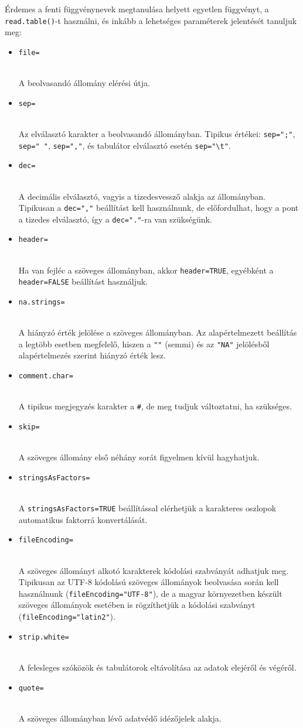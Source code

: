 \documentclass[
]{book}
\providecommand{\tightlist}{%
  \setlength{\itemsep}{0pt}\setlength{\parskip}{0pt}}
\begin{document}
Érdemes a fenti függvénynevek megtanulása helyett egyetlen függvényt, a \texttt{read.table()}-t használni, és inkább a lehetséges paraméterek jelentését tanuljuk meg:

\begin{itemize}
\tightlist
\item
  \texttt{file=}\strut \\
  A beolvasandó állomány elérési útja.
\item
  \texttt{sep=}\strut \\
  Az elválasztó karakter a beolvasandó állományban. Tipikus értékei: \texttt{sep=";"}, \texttt{sep="\ "}, \texttt{sep=","}, és tabulátor elválasztó esetén \texttt{sep="\textbackslash{}t"}.
\item
  \texttt{dec=}\strut \\
  A decimális elválasztó, vagyis a tizedesvessző alakja az állományban. Tipikusan a \texttt{dec=","} beállítást kell használnunk, de előfordulhat, hogy a pont a tizedes elválasztó, így a \texttt{dec="."}-ra van szükségünk.
\item
  \texttt{header=}\strut \\
  Ha van fejléc a szöveges állományban, akkor \texttt{header=TRUE}, egyébként a \texttt{header=FALSE} beállítást használjuk.
\item
  \texttt{na.strings=}\strut \\
  A hiányzó érték jelölése a szöveges állományban. Az alapértelmezett beállítás a legtöbb esetben megfelelő, hiszen a \texttt{""} (semmi) és az \texttt{"NA"} jelölésből alapértelmezés szerint hiányzó érték lesz.
\item
  \texttt{comment.char=}\strut \\
  A tipikus megjegyzés karakter a \texttt{\#}, de meg tudjuk változtatni, ha szükséges.
\item
  \texttt{skip=}\strut \\
  A szöveges állomány első néhány sorát figyelmen kívül hagyhatjuk.
\item
  \texttt{stringsAsFactors=}\strut \\
  A \texttt{stringsAsFactors=TRUE} beállítással elérhetjük a karakteres oszlopok automatikus faktorrá konvertálását.
\item
  \texttt{fileEncoding=}\strut \\
  A szöveges állományt alkotó karakterek kódolási szabványát adhatjuk meg. Tipikusan az UTF-8 kódolású szöveges állományok beolvasása során kell használnunk (\texttt{fileEncoding="UTF-8"}), de a magyar környezetben készült szöveges állományok esetében is rögzíthetjük a kódolási szabványt (\texttt{fileEncoding="latin2"}).
\item
  \texttt{strip.white=}\strut \\
  A felesleges szóközök és tabulátorok eltávolítása az adatok elejéről és végéről.
\item
  \texttt{quote=}\strut \\
  A szöveges állományban lévő adatvédő idézőjelek alakja.
\end{itemize}
\end{document}
